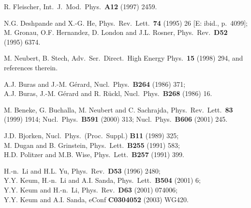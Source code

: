 \documentclass[12pt]{article}
\begin{document}
\begin{thebibliography}{999}
R. Fleischer,
{ Int.\ J.\ Mod.\ Phys.}~{\bf A12} (1997) 2459.

N.G. Deshpande and X.-G. He,
{ Phys.\ Rev.\ Lett.}~{\bf 74} (1995) 26 [E: ibid., p.\ 4099];\\
M. Gronau, O.F. Hernandez, D. London and J.L. Rosner,
{ Phys.\ Rev.}~{\bf D52} (1995) 6374.

M. Neubert, B. Stech,
{ Adv.\ Ser.\ Direct.\ High Energy Phys.}~{\bf 15} (1998) 294,
and references therein.

A.J. Buras and J.-M. G\'erard,
{ Nucl.\ Phys.}~{\bf B264} (1986) 371;\\
A.J. Buras, J.-M. G\'erard and R. R\"uckl,
{ Nucl.\ Phys.}~{\bf B268} (1986) 16.

M. Beneke, G. Buchalla, M. Neubert and
C. Sachrajda,
{ Phys.\ Rev.\ Lett.}~{\bf 83} (1999) 1914;
{ Nucl.\ Phys.}~{\bf B591} (2000) 313;
{Nucl.\ Phys.}~{\bf B606} (2001) 245.

J.D. Bjorken, { Nucl.\ Phys.\ (Proc.\ Suppl.)}
{\bf B11} (1989) 325;\\
M. Dugan and B. Grinstein, { Phys.\ Lett.}~{\bf B255} (1991) 583;\\
H.D. Politzer and M.B. Wise, { Phys.\ Lett.}~{\bf B257} (1991) 399.

H.-n.\ Li and H.L. Yu,
{ Phys.\ Rev.}~{\bf D53} (1996) 2480;\\
Y.Y. Keum, H.-n.\ Li and A.I. Sanda,
{ Phys.\ Lett.}~{\bf B504} (2001) 6;\\
Y.Y. Keum and H.-n.\ Li,
{ Phys.\ Rev.}~{\bf D63} (2001) 074006;\\
Y.Y. Keum and A.I. Sanda,
eConf {\bf C0304052} (2003) WG420.%


\end{thebibliography}
\end{document}
